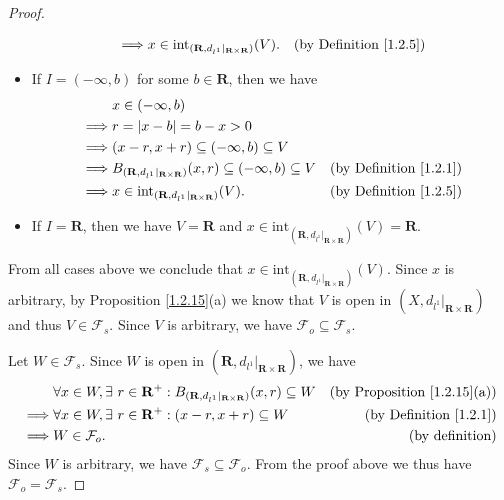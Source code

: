 \begin{proof}
\begin{itemize}
\begin{align*}
                  \implies & x \in \text{int}_{(\mathbf{R}, d_{l^1}|_{\mathbf{R} \times \mathbf{R}})}(V).                      & \text{(by Definition \ref{1.2.5})}
              \end{align*}
        \item If \(I = (-\infty, b)\) for some \(b \in \mathbf{R}\), then we have
              \begin{align*}
                           & x \in (-\infty, b)                                                                                                                      \\
                  \implies & r = \abs*{x - b} = b - x > 0                                                                                                            \\
                  \implies & (x - r, x + r) \subseteq (-\infty, b) \subseteq V                                                                                       \\
                  \implies & B_{(\mathbf{R}, d_{l^1}|_{\mathbf{R} \times \mathbf{R}})}(x, r) \subseteq (-\infty, b) \subseteq V & \text{(by Definition \ref{1.2.1})} \\
                  \implies & x \in \text{int}_{(\mathbf{R}, d_{l^1}|_{\mathbf{R} \times \mathbf{R}})}(V).                       & \text{(by Definition \ref{1.2.5})}
              \end{align*}
        \item If \(I = \mathbf{R}\), then we have \(V = \mathbf{R}\) and \(x \in \text{int}_{(\mathbf{R}, d_{l^1}|_{\mathbf{R} \times \mathbf{R}})}(V) = \mathbf{R}\).
    \end{itemize}
    From all cases above we conclude that \(x \in \text{int}_{(\mathbf{R}, d_{l^1}|_{\mathbf{R} \times \mathbf{R}})}(V)\).
    Since \(x\) is arbitrary, by Proposition \ref{1.2.15}(a) we know that \(V\) is open in \((X, d_{l^1}|_{\mathbf{R} \times \mathbf{R}})\) and thus \(V \in \mathcal{F}_s\).
    Since \(V\) is arbitrary, we have \(\mathcal{F}_o \subseteq \mathcal{F}_s\).

    Let \(W \in \mathcal{F}_s\).
    Since \(W\) is open in \((\mathbf{R}, d_{l^1}|_{\mathbf{R} \times \mathbf{R}})\), we have
    \begin{align*}
                 & \forall x \in W, \exists\ r \in \mathbf{R}^+ : B_{(\mathbf{R}, d_{l^1}|_{\mathbf{R} \times \mathbf{R}})}(x, r) \subseteq W & \text{(by Proposition \ref{1.2.15}(a))} \\
        \implies & \forall x \in W, \exists\ r \in \mathbf{R}^+ : (x - r, x + r) \subseteq W                                                  & \text{(by Definition \ref{1.2.1})}      \\
        \implies & W \in \mathcal{F}_o.                                                                                                       & \text{(by definition)}
    \end{align*}
    Since \(W\) is arbitrary, we have \(\mathcal{F}_s \subseteq \mathcal{F}_o\).
    From the proof above we thus have \(\mathcal{F}_o = \mathcal{F}_s\).


\end{proof}
